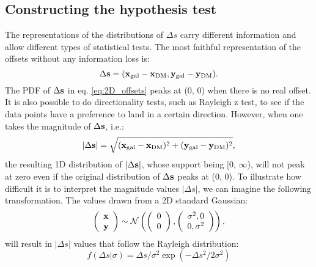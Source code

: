 \subsection{Constructing the hypothesis test} 
\label{subsec:hypothesis_test}
The representations of the distributions of $\Delta s$ carry
different information and allow different types of statistical tests. 
The most faithful representation of the offsets without any information loss
is:
\begin{equation}
	\Delta {\bf s} = ({\bf x}_{\rm gal} - {\bf x}_{\rm DM}, 
	{\bf y}_{\rm gal} - {\bf y}_{\rm DM} ).
	\label{eq:2D_offsets}
\end{equation}
The PDF of $\Delta {\bf s}$ in eq. \ref{eq:2D_offsets} peaks at (0, 0) when
there is no real offset. It is also possible to do directionality tests,
such as Rayleigh z test, to see if the data points have a preference to land in
a certain direction.
However, when one takes the magnitude of $\Delta {\bf s}$, i.e.:
\begin{equation}
	|\Delta {\bf s}| = \sqrt{({\bf x}_{\rm gal} - {\bf x}_{\rm DM})^2 + 
	({\bf y}_{\rm gal} - {\bf y}_{\rm DM})^2},
	\label{eq:magnitude_offsets}
\end{equation}
the resulting 1D distribution of $|\Delta {\bf s}|$, 
whose support being [0, $\infty$),
will not peak at zero even if the original
distribution of $\Delta {\bf s}$ peaks at (0, 0). 
To illustrate how difficult it is to interpret the magnitude values $|\Delta
s|$,  
we can imagine the following transformation.
The values drawn from a 2D standard Gaussian: 
\begin{equation}
	\left(\begin{array}{c}
			\bf{x}\\
			\bf{y}
		\end{array}
	\right) \sim \mathcal{N}\left(
	\left(
		\begin{array}{c}
			0 \\
			0
		\end{array}
	\right),
	\left(\begin{array}{cc}
		\sigma^2, 0 \\
		0, \sigma^2
	 \end{array}
	\right)
\right),
\end{equation}
will result in $|\Delta s|$ values that follow the Rayleigh distribution:
\begin{equation}
	f(\Delta s | \sigma) = \Delta s /  \sigma^2 \exp(-\Delta s^2 / 2 \sigma^2)
	\label{eq:rayleigh_distro}
\end{equation}
